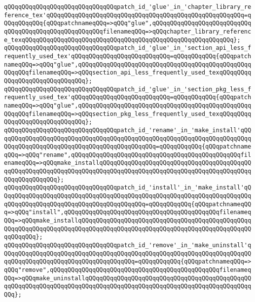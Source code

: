 \newline
\verb|qQQqqQQqqQQqqQQqqQQqqQQqqQQqqQQqpatch_id_'glue'_in_'chapter_library_reference_tex'qQQqqQQqqQQqqQQqqQQqqQQqqQQqqQQqqQQqqQQqqQQqqQQqqQQqqQQq=qQQqqQQqqQQq{qQQqpatchnameqQQq=>qQQq"glue",qQQqqQQqqQQqqQQqqQQqqQQqqQQqqQQqqQQqqQQqqQQqqQQqqQQqqQQqfilenameqQQq=>qQQqchapter_library_reference_texqQQqqQQqqQQqqQQqqQQqqQQqqQQqqQQqqQQqqQQqqQQqqQQqqQQqqQQqqQQq};|\newline
\newline
\verb|qQQqqQQqqQQqqQQqqQQqqQQqqQQqqQQqpatch_id_'glue'_in_'section_api_less_frequently_used_tex'qQQqqQQqqQQqqQQqqQQqqQQqqQQq=qQQqqQQqqQQq{qQQqpatchnameqQQq=>qQQq"glue",qQQqqQQqqQQqqQQqqQQqqQQqqQQqqQQqqQQqqQQqqQQqqQQqqQQqqQQqfilenameqQQq=>qQQqsection_api_less_frequently_used_texqQQqqQQqqQQqqQQqqQQqqQQqqQQqqQQq};|\newline
\verb|qQQqqQQqqQQqqQQqqQQqqQQqqQQqqQQqpatch_id_'glue'_in_'section_pkg_less_frequently_used_tex'qQQqqQQqqQQqqQQqqQQqqQQqqQQq=qQQqqQQqqQQq{qQQqpatchnameqQQq=>qQQq"glue",qQQqqQQqqQQqqQQqqQQqqQQqqQQqqQQqqQQqqQQqqQQqqQQqqQQqqQQqfilenameqQQq=>qQQqsection_pkg_less_frequently_used_texqQQqqQQqqQQqqQQqqQQqqQQqqQQqqQQq};|\newline
\newline
\verb|qQQqqQQqqQQqqQQqqQQqqQQqqQQqqQQqpatch_id_'rename'_in_'make_install'qQQqqQQqqQQqqQQqqQQqqQQqqQQqqQQqqQQqqQQqqQQqqQQqqQQqqQQqqQQqqQQqqQQqqQQqqQQqqQQqqQQqqQQqqQQqqQQqqQQqqQQqqQQqqQQqqQQq=qQQqqQQqqQQq{qQQqpatchnameqQQq=>qQQq"rename",qQQqqQQqqQQqqQQqqQQqqQQqqQQqqQQqqQQqqQQqqQQqqQQqfilenameqQQq=>qQQqmake_installqQQqqQQqqQQqqQQqqQQqqQQqqQQqqQQqqQQqqQQqqQQqqQQqqQQqqQQqqQQqqQQqqQQqqQQqqQQqqQQqqQQqqQQqqQQqqQQqqQQqqQQqqQQqqQQqqQQqqQQqqQQqqQQq};|\newline
\verb|qQQqqQQqqQQqqQQqqQQqqQQqqQQqqQQqpatch_id_'install'_in_'make_install'qQQqqQQqqQQqqQQqqQQqqQQqqQQqqQQqqQQqqQQqqQQqqQQqqQQqqQQqqQQqqQQqqQQqqQQqqQQqqQQqqQQqqQQqqQQqqQQqqQQqqQQqqQQqqQQq=qQQqqQQqqQQq{qQQqpatchnameqQQq=>qQQq"install",qQQqqQQqqQQqqQQqqQQqqQQqqQQqqQQqqQQqqQQqqQQqfilenameqQQq=>qQQqmake_installqQQqqQQqqQQqqQQqqQQqqQQqqQQqqQQqqQQqqQQqqQQqqQQqqQQqqQQqqQQqqQQqqQQqqQQqqQQqqQQqqQQqqQQqqQQqqQQqqQQqqQQqqQQqqQQqqQQqqQQqqQQqqQQq};|\newline
\newline
\verb|qQQqqQQqqQQqqQQqqQQqqQQqqQQqqQQqpatch_id_'remove'_in_'make_uninstall'qQQqqQQqqQQqqQQqqQQqqQQqqQQqqQQqqQQqqQQqqQQqqQQqqQQqqQQqqQQqqQQqqQQqqQQqqQQqqQQqqQQqqQQqqQQqqQQqqQQqqQQqqQQq=qQQqqQQqqQQq{qQQqpatchnameqQQq=>qQQq"remove",qQQqqQQqqQQqqQQqqQQqqQQqqQQqqQQqqQQqqQQqqQQqqQQqfilenameqQQq=>qQQqmake_uninstallqQQqqQQqqQQqqQQqqQQqqQQqqQQqqQQqqQQqqQQqqQQqqQQqqQQqqQQqqQQqqQQqqQQqqQQqqQQqqQQqqQQqqQQqqQQqqQQqqQQqqQQqqQQqqQQqqQQqqQQq};|\newline

